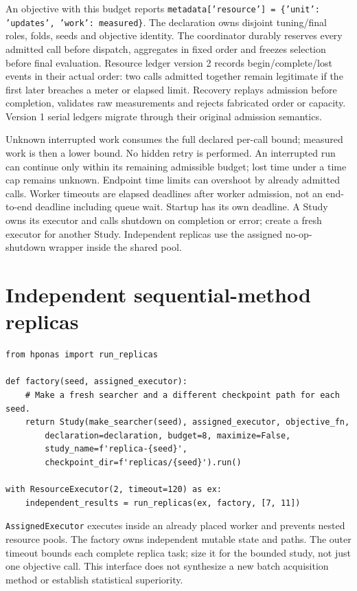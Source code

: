 An objective with this budget reports
\texttt{metadata['resource'] = \{'unit': 'updates', 'work': measured\}}.
The declaration owns disjoint tuning/final roles, folds, seeds and objective
identity. The coordinator durably reserves every admitted call before dispatch,
aggregates in fixed order and freezes selection before final evaluation.
Resource ledger version 2 records begin/complete/lost events in their actual
order: two calls admitted together remain legitimate if the first later
breaches a meter or elapsed limit. Recovery replays admission before completion,
validates raw measurements and rejects fabricated order or capacity.
Version 1 serial ledgers migrate through their original admission semantics.

Unknown interrupted work consumes the full declared per-call bound; measured
work is then a lower bound. No hidden retry is performed. An interrupted run
can continue only within its remaining admissible budget; lost time under a
time cap remains unknown. Endpoint time limits can overshoot by already
admitted calls. Worker timeouts are elapsed deadlines after worker admission,
not an end-to-end deadline including queue wait. Startup has its own deadline. A Study owns its executor and calls shutdown on completion or error; create a fresh executor for another Study. Independent replicas use the assigned no-op-shutdown wrapper inside the shared pool.

\section{Independent sequential-method replicas}
\begin{Verbatim}[fontsize=\small]
from hponas import run_replicas

def factory(seed, assigned_executor):
    # Make a fresh searcher and a different checkpoint path for each seed.
    return Study(make_searcher(seed), assigned_executor, objective_fn,
        declaration=declaration, budget=8, maximize=False,
        study_name=f'replica-{seed}',
        checkpoint_dir=f'replicas/{seed}').run()

with ResourceExecutor(2, timeout=120) as ex:
    independent_results = run_replicas(ex, factory, [7, 11])
\end{Verbatim}
\texttt{AssignedExecutor} executes inside an already placed worker and prevents
nested resource pools. The factory owns independent mutable state and paths.
The outer timeout bounds each complete replica task; size it for the bounded
study, not just one objective call. This interface does not synthesize a new
batch acquisition method or establish statistical superiority.

